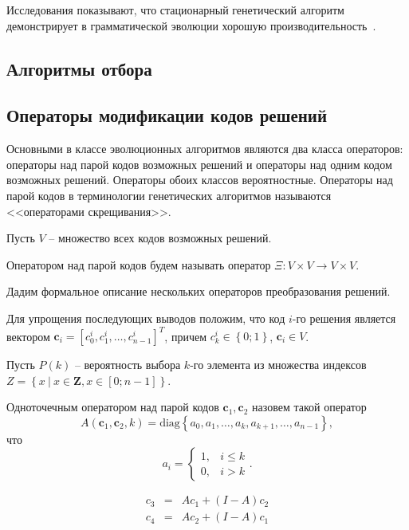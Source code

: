 Исследования показывают, что стационарный генетический алгоритм~\cite{DeJoSarm1992} демонстрирует в грамматической эволюции хорошую производительность~\cite{RyanONe1998}.

\subsection{Алгоритмы отбора} \label{subsect:selection}

\subsection{Операторы модификации кодов решений} \label{subsect:modifications}

Основными в классе эволюционных алгоритмов являются два класса операторов: операторы над парой кодов возможных решений и операторы над одним кодом возможных решений.
Операторы обоих классов вероятностные.
Операторы над парой кодов в терминологии генетических алгоритмов называются <<операторами скрещивания>>.

Пусть $V$ -- множество всех кодов возможных решений.

\begin{definition}
    Оператором над парой кодов будем называть оператор $\Xi: V \times V \to V \times V$.
\end{definition}

Дадим формальное описание нескольких операторов преобразования решений.

Для упрощения последующих выводов положим, что код $i$-го решения является вектором $\mathbf{c}_i = \left[c^i_0, c^i_1, \dots, c^i_{n-1}\right]^T$, причем $c^i_k \in \left\{0; 1 \right\}$, $\mathbf{c}_i \in V$.

Пусть $P(k)$ -- вероятность выбора $k$-го элемента из множества индексов $Z = \left\{x~|~x \in \mathbf{Z}, x \in \left[0; n-1\right] \right\}$.

\begin{definition}
    Одноточечным оператором над парой кодов $\mathbf{c}_1, \mathbf{c}_2$ назовем такой оператор 
    $$A\left(\mathbf{c}_1, \mathbf{c}_2, k\right) = \mathrm{diag}\left\{a_0, a_1, \dots, a_k, a_{k+1}, \dots, a_{n-1}\right\},$$ что 
    $$a_i = \begin{cases} 1, & i \leq k \\ 0, & i > k \end{cases}.$$
\end{definition}


\begin{equation}
    \begin{array}{ccc}
        c_3 & = & A c_1 + (I - A) c_2  \\
        c_4 & = & A c_2 + (I - A) c_1  
    \end{array}
\end{equation}

